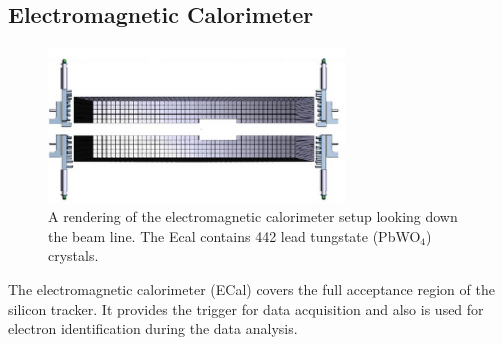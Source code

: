 \documentclass[b1]{sciposter}
\begin{document}
\begin{multicols}{3}
	\subsection*{Electromagnetic Calorimeter}
	\begin{figure}
		\begin{center}
			\includegraphics[width=0.7\textwidth]{ECal_looking_downstream}
		\end{center}
		\caption{A rendering of the electromagnetic calorimeter setup looking down the beam line. %
		The Ecal contains 442 lead tungstate (PbWO$_4$) crystals.
		}
	\end{figure}

	The electromagnetic calorimeter (ECal) covers the full acceptance region of the silicon tracker.
	It provides the trigger for data acquisition and also
	is used for electron identification during the data analysis. \cite{Balossino:2016nly}





\end{multicols}
\end{document}
